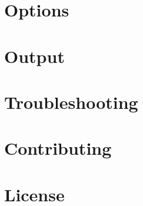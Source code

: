 \documentclass{article}
\begin{document}
\section{Options}

\section{Output}

\section{Troubleshooting}

\section{Contributing}

\section{License}
\end{document}
